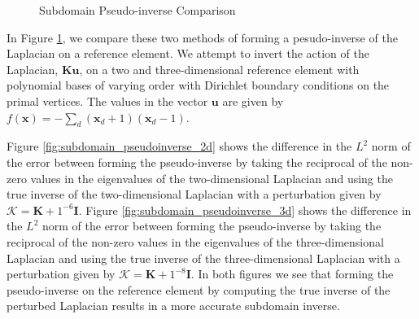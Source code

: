 \begin{figure}[!ht]
  \centering
  \hfill
  \caption{Subdomain Pseudo-inverse Comparison}
  \label{fig:subdomain_pseudoinverse}
\end{figure}

In Figure \ref{fig:subdomain_pseudoinverse}, we compare these two methods of forming a pesudo-inverse of the Laplacian on a reference element.
We attempt to invert the action of the Laplacian, $\mathbf{K} \mathbf{u}$, on a two and three-dimensional reference element with polynomial bases of varying order with Dirichlet boundary conditions on the primal vertices.
The values in the vector $\mathbf{u}$ are given by $f \left( \mathbf{x} \right) = - \sum_d \left( \mathbf{x}_d + 1 \right) \left( \mathbf{x}_d - 1 \right)$.

Figure \ref{fig:subdomain_pseudoinverse_2d} shows the difference in the $L^2$ norm of the error between forming the pseudo-inverse by taking the reciprocal of the non-zero values in the eigenvalues of the two-dimensional Laplacian and using the true inverse of the two-dimensional Laplacian with a perturbation given by $\boldsymbol{\mathcal{K}} = \mathbf{K} + 1^{-6} \mathbf{I}$.
Figure \ref{fig:subdomain_pseudoinverse_3d} shows the difference in the $L^2$ norm of the error between forming the pseudo-inverse by taking the reciprocal of the non-zero values in the eigenvalues of the three-dimensional Laplacian and using the true inverse of the three-dimensional Laplacian with a perturbation given by $\boldsymbol{\mathcal{K}} = \mathbf{K} + 1^{-8} \mathbf{I}$.
In both figures we see that forming the pseudo-inverse on the reference element by computing the true inverse of the perturbed Laplacian results in a more accurate subdomain inverse.

